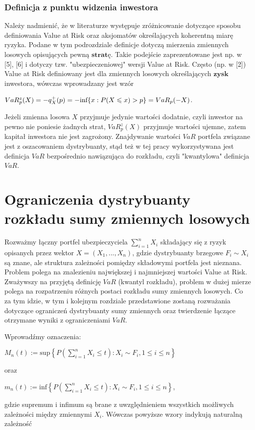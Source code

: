\documentclass[12pt,a4paper,openany]{book}
\begin{document}
\subsection{Definicja z punktu widzenia inwestora}

Należy nadmienić, że w literaturze występuje zróżnicowanie dotyczące sposobu definiowania Value at Risk oraz aksjomatów określających koherentną miarę ryzyka. Podane w tym podrozdziale definicje dotyczą mierzenia zmiennych losowych opisujących pewną $\textbf{stratę}$. Takie podejście zaprezentowane jest np. w [5], [6] i dotyczy tzw. "ubezpieczeniowej" \phantom{v} wersji Value at Risk. Często (np. w [2]) Value at Risk definiowany jest dla zmiennych losowych określających $\textbf{zysk}$ inwestora, wówczas wprowadzany jest wzór 
\begin{center}
$VaR_{p}^{z}(X)  = -q^{+}_{X}(p) =-\textnormal{inf}\lbrace x: P(X \leqslant x) > p \rbrace = VaR_{p}(-X)$.
\end{center}
Jeżeli zmienna losowa $X$ przyjmuje jedynie wartości dodatnie, czyli inwestor na pewno nie poniesie żadnych strat, $VaR_{p}^{z}(X)$ przyjmuje wartości ujemne, zatem kapitał inwestora nie jest zagrożony. Znajdywanie wartości $VaR$ portfela związane jest z oszacowaniem dystrybuanty, stąd też w tej pracy wykorzystywana jest definicja $VaR$ bezpośrednio nawiązująca do rozkładu, czyli "kwantylowa" definicja $VaR$.


\chapter{Ograniczenia dystrybuanty rozkładu sumy zmiennych losowych}

Rozważmy łączny portfel ubezpieczyciela $\sum\limits_{i=1}^{n} X_{i}$ składający się z ryzyk opisanych przez wektor $X = (X_{1},...,X_{n})$, gdzie dystrybuanty brzegowe  $F_{i} \sim X_{i}$ są znane, ale struktura zależności pomiędzy składowymi portfela jest nieznana. Problem polega na znalezieniu największej i najmniejszej wartości Value at Risk. Zważywszy na przyjętą definicję $VaR$ (kwantyl rozkładu), problem w dużej mierze polega na rozpatrzeniu różnych postaci rozkładu sumy zmiennych losowych. Co za tym idzie, w tym i kolejnym rozdziale przedstawione zostaną rozważania dotyczące ograniczeń dystrybuanty sumy zmiennych oraz twierdzenie łączące otrzymane wyniki z ograniczeniami $VaR$.

Wprowadźmy oznaczenia:

\begin{center}
$M_{n}(t) := \text{sup} \left\lbrace  P\left(\sum\limits_{i=1}^{n} X_{i} \leqslant t\right): X_{i} \sim F_{i}, 1 \leqslant i \leqslant n \right\rbrace $
\end{center}
oraz
\begin{center}
$m_{n}(t) := \text{inf} \left\lbrace  P\left(\sum\limits_{i=1}^{n} X_{i} \leqslant t\right): X_{i} \sim F_{i}, 1 \leqslant i \leqslant n \right\rbrace $,
\end{center}
gdzie supremum i infimum są brane z uwzględnieniem wszystkich możliwych zależności między zmiennymi $X_{i}$.
Wówczas powyższe wzory indykują naturalną zależność
\end{document}
